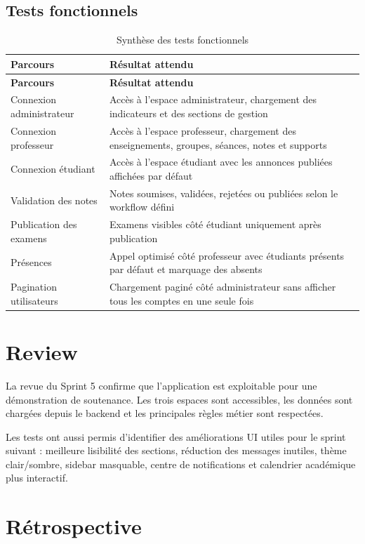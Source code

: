 \documentclass[12pt,a4paper]{report}
\begin{document}
\subsection*{Tests fonctionnels}

\begin{longtable}{|p{4cm}|p{9.5cm}|}
\caption{Synthèse des tests fonctionnels}\\
\hline
\textbf{Parcours} & \textbf{Résultat attendu} \\
\hline
\endfirsthead
\hline
\textbf{Parcours} & \textbf{Résultat attendu} \\
\hline
\endhead
Connexion administrateur & Accès à l'espace administrateur, chargement des indicateurs et des sections de gestion \\
\hline
Connexion professeur & Accès à l'espace professeur, chargement des enseignements, groupes, séances, notes et supports \\
\hline
Connexion étudiant & Accès à l'espace étudiant avec les annonces publiées affichées par défaut \\
\hline
Validation des notes & Notes soumises, validées, rejetées ou publiées selon le workflow défini \\
\hline
Publication des examens & Examens visibles côté étudiant uniquement après publication \\
\hline
Présences & Appel optimisé côté professeur avec étudiants présents par défaut et marquage des absents \\
\hline
Pagination utilisateurs & Chargement paginé côté administrateur sans afficher tous les comptes en une seule fois \\
\hline
\end{longtable}

\section{Review}

La revue du Sprint 5 confirme que l'application est exploitable pour une démonstration de soutenance. Les trois espaces sont accessibles, les données sont chargées depuis le backend et les principales règles métier sont respectées.

Les tests ont aussi permis d'identifier des améliorations UI utiles pour le sprint suivant : meilleure lisibilité des sections, réduction des messages inutiles, thème clair/sombre, sidebar masquable, centre de notifications et calendrier académique plus interactif.

\section{Rétrospective}
\end{document}
